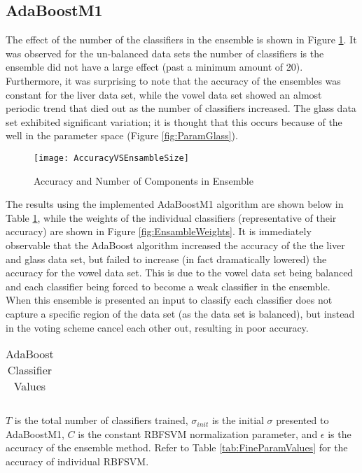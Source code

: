 \subsection{AdaBoostM1}
\label{sec:Results_AdaBoost}
The effect of the number of the classifiers in the ensemble is shown in Figure \ref{fig:AccuracyEnsambleSize}.
It was observed for the un-balanced data sets the number of classifiers is the ensemble did not have a large effect (past a minimum amount of 20).
Furthermore, it was surprising to note that the accuracy of the ensembles was constant for the liver data set, while the vowel data set showed an almost periodic trend that died out as the number of classifiers increased.
The glass data set exhibited significant variation; it is thought that this occurs because of the well in the parameter space (Figure \ref{fig:ParamGlass}).
\begin{figure}[!ht]
    \centering
    \texttt{[image: AccuracyVSEnsambleSize]}
    \caption{Accuracy and Number of Components in Ensemble}
    \label{fig:AccuracyEnsambleSize}
\end{figure}

The results using the implemented AdaBoostM1 algorithm are shown below in Table \ref{tab:AdaBoostValues}, while the weights of the individual classifiers (representative of their accuracy) are shown in Figure \ref{fig:EnsambleWeights}.
It is immediately observable that the AdaBoost algorithm increased the accuracy of the the liver and glass data set, but failed to increase (in fact dramatically lowered) the accuracy for the vowel data set.
This is due to the vowel data set being balanced and each classifier being forced to become a weak classifier in the ensemble.
When this ensemble  is presented an input to classify each classifier does not capture a specific region of the data set (as the data set is balanced), but instead in the voting scheme cancel each other out, resulting in poor accuracy.
\begin{table}[!ht]
\caption{AdaBoost Classifier Values}
\label{tab:AdaBoostValues}
\begin{center}
\begin{tabular}{c c c c c}
\hline

\\
\hline

\hline
\end{tabular}
\end{center}

\normalsize
$T$ is the total number of classifiers trained, $\sigma_{init}$ is the initial $\sigma$ presented to AdaBoostM1, $C$ is the constant RBFSVM normalization parameter, and $\epsilon$ is the accuracy of the ensemble method.  Refer to Table \ref{tab:FineParamValues} for the accuracy of individual RBFSVM.
\end{table}

